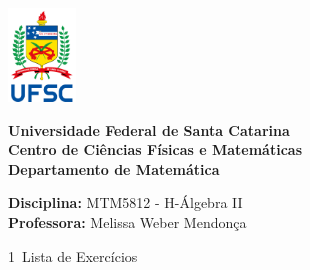 \documentclass[12pt]{article}
\begin{document}
\ \vspace{-1.4cm}
\begin{tcolorbox}[colback=black!0]
    \noindent
    \begin{minipage}{0.14\linewidth}
        \hspace*{-0.2cm}\includegraphics[height = 2.5cm]{UFSC.png}
    \end{minipage}
	\noindent
	\begin{minipage}{0.79\linewidth}
	    \begin{center}
	        \vspace*{0.2cm}
	        {\bf \large Universidade Federal de Santa Catarina} \\ \vspace{0.3cm}
			{\bf \large Centro de Ciências Físicas e Matemáticas} \\ \vspace{0.3cm}
			{\bf \large Departamento de Matemática}
		\end{center}
	\end{minipage}
\end{tcolorbox}

\noindent\textbf{Disciplina:} MTM5812 - H-Álgebra II\\
\textbf{Professora:} Melissa Weber Mendonça

\begin{center}
    \Large{1\textordfeminine\ Lista de Exercícios}
\end{center}
\end{document}

